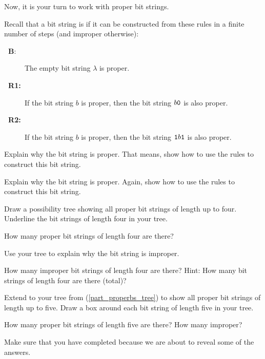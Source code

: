     Now, it is your turn to work with proper bit strings.
    
\begin{act}
\label{act_proper_bs}
    Recall that a bit string is  if it can be constructed from these rules in a finite number of steps (and improper otherwise):
                \begin{description}  
                    \item [\textbf{~\quad B}:] The empty bit string $\lambda$ is proper.
                    \item [\textbf{~\quad R1:}] If the bit string $b$ is proper, then the bit string $b\texttt{0}$ is also proper. 
                    \item [\textbf{~\quad R2:}] If the bit string $b$ is proper, then the bit string $\texttt{1}b\texttt{1}$ is also proper.
                \end{description} 
        \begin{actpart}
            \item Explain why the bit string  is proper. That means, show how to use the rules to construct this bit string. 
            \item Explain why the bit string  is proper. Again, show how to use the rules to construct this bit string. 
            \item \label{part_properbs_tree} Draw a possibility tree showing all proper bit strings of length up to four. Underline the bit strings of length four in your tree.
            \item How many proper bit strings of length four are there? 
            \item Use your tree to explain why the bit string  is improper.
            \item How many improper bit strings of length four are there?  Hint: How many bit strings of length four are there (total)? 
            \item Extend to your tree from (\ref{part_properbs_tree}) to show all proper bit strings of length up to five. Draw a box around each bit string of length five in your tree.
            \item How many proper bit strings of length five are there?  How many improper?
        \end{actpart}
\end{act}

Make sure that you have completed  because we are about to reveal some of the answers.

